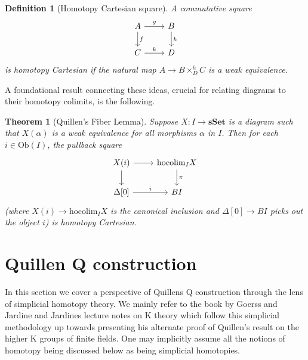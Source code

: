 \documentclass[12pt]{report}
\numberwithin{equation}{section}
\newtheorem{theorem}[dummy]{Theorem}
\newtheorem{definition}[dummy]{Definition}
\begin{document}
	\begin{definition}[Homotopy Cartesian square]
		A commutative square
		\[
		\begin{tikzcd}
			A \arrow{r}{g} \arrow{d}{f} & B \arrow{d}{h} \\
			C \arrow{r}{k} & D
		\end{tikzcd}
		\]
		is homotopy Cartesian if the natural map $A \to B \times^h_D C$ is a weak equivalence.
	\end{definition}
	
	A foundational result connecting these ideas, crucial for relating diagrams to their homotopy colimits, is the following.	
	
	\begin{theorem}[Quillen's Fiber Lemma]\label{thm:quillen_fiber_lemma_condensed}
		Suppose $X: I \to \mathbf{sSet}$ is a diagram such that $X(\alpha)$ is a weak equivalence for all morphisms $\alpha$ in $I$. Then for each $i \in \mathrm{Ob}(I)$, the pullback square
		\[
		\begin{tikzcd}
			X(i) \arrow{r} \arrow{d} & \mathrm{hocolim}_{I} X \arrow{d}{\pi} \\
			\Delta[0] \arrow{r}{i} & BI
		\end{tikzcd}
		\]
		(where $X(i) \to \mathrm{hocolim}_I X$ is the canonical inclusion and $\Delta[0] \to BI$ picks out the object $i$) is homotopy Cartesian.
	\end{theorem}
	
	\chapter{Quillen Q construction}
		
	In this section we cover a perspective of Quillens Q construction through the lens of simplicial homotopy theory. We mainly refer to the book by Goerss and Jardine \cite{Goerss_Jardine_2009} and Jardines lecture notes on K theory \cite{jardinenotes} which follow this simplicial methodology up towards presenting his alternate proof of Quillen's result on the higher K groups of finite fields. One may implicitly assume all the notions of homotopy being discussed below as being simplicial homotopies.
		
		
\end{document}
